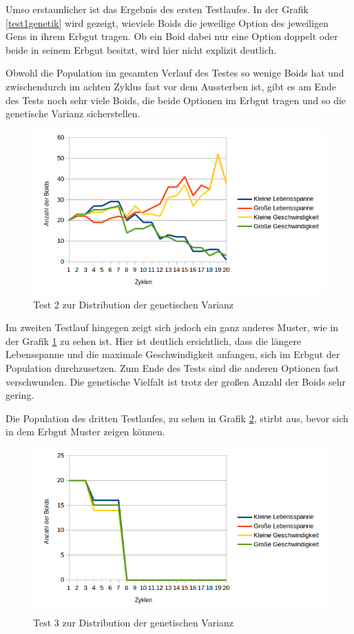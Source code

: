 \documentclass[draft=false
              ,paper=a4
              ,twoside=false
              ,fontsize=11pt
              ,headsepline
              ,BCOR10mm
              ,DIV11
              ,bibtotoc
              ,liststotoc
              ]{scrbook}
\begin{document}
Umso erstaunlicher ist das Ergebnis des ersten Testlaufes. In der Grafik \ref{test1genetik} wird gezeigt, wieviele Boids die jeweilige Option des jeweiligen Gens in ihrem Erbgut tragen. Ob ein Boid dabei nur eine Option doppelt oder beide in seinem Erbgut besitzt, wird hier nicht explizit deutlich.

Obwohl die Population im gesamten Verlauf des Testes so wenige Boids hat und zwischendurch im achten Zyklus fast vor dem Aussterben ist, gibt es am Ende des Tests noch sehr viele Boids, die beide Optionen im Erbgut tragen und so die genetische Varianz sicherstellen.

\begin{figure}[!h]
\centering
\includegraphics[scale=0.80]{project/Test2-Genetik.png}
\caption{Test 2 zur Distribution der genetischen Varianz}
\label{test2genetik}
\end{figure}

Im zweiten Testlauf hingegen zeigt sich jedoch ein ganz anderes Muster, wie in der Grafik \ref{test2genetik} zu sehen ist. Hier ist deutlich ersichtlich, dass die längere Lebensspanne und die maximale Geschwindigkeit anfangen, sich im Erbgut der Population durchzusetzen. Zum Ende des Tests sind die anderen Optionen fast verschwunden. Die genetische Vielfalt ist trotz der großen Anzahl der Boids sehr gering.

Die Population des dritten Testlaufes, zu sehen in Grafik \ref{test3genetik}, stirbt aus, bevor sich in dem Erbgut Muster zeigen können.

\begin{figure}[!h]
\centering
\includegraphics[scale=0.80]{project/Test3-Genetik.png}
\caption{Test 3 zur Distribution der genetischen Varianz}
\label{test3genetik}
\end{figure}
\end{document}
